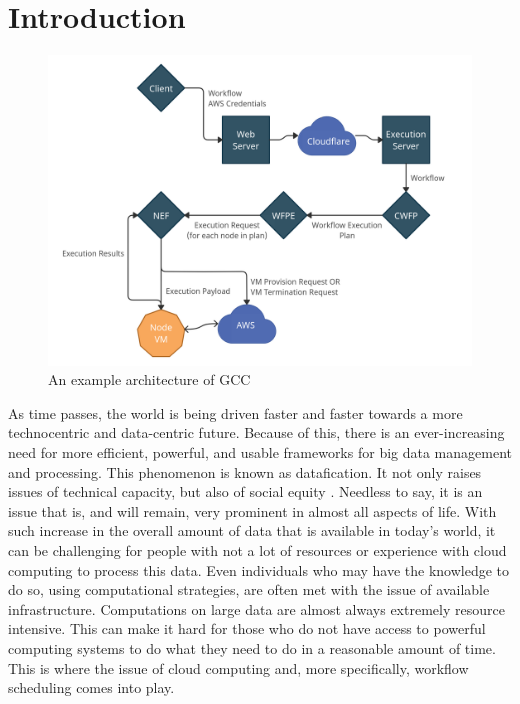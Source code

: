 \documentclass[fleqn,10pt]{SelfArx} %
\affiliation{\textsuperscript{1}\textit{Department of Computer Science, Allegheny College, Meadville, PA}}
\affiliation{*\textbf{Corresponding author}: lorian@allegheny.edu}
\begin{document}
\maketitle %

\tableofcontents %

\thispagestyle{empty} %


\section{Introduction}
\label{sec:introduction}

\begin{figure}[t!]
\includegraphics[width=\textwidth]{Figures/gcc_total_workflow.png}
\caption{An example architecture of GCC}
\label{fig:gccworkflow}
\end{figure}

As time passes, the world is being driven faster and faster towards a more technocentric and data-centric future. Because of this, there is an ever-increasing need for more efficient, powerful, and usable frameworks for big data management and processing. This phenomenon is known as datafication. It not only raises issues of technical capacity, but also of social equity \cite{mejias2019datafication}. Needless to say, it is an issue that is, and will remain, very prominent in almost all aspects of life. With such increase in the overall amount of data that is available in today's world, it can be challenging for people with not a lot of resources or experience with cloud computing to process this data. Even individuals who may have the knowledge to do so, using computational strategies, are often met with the issue of available infrastructure. Computations on large data are almost always extremely resource intensive. This can make it hard for those who do not have access to powerful computing systems to do what they need to do in a reasonable amount of time. This is where the issue of cloud computing and, more specifically, workflow scheduling comes into play.
\end{document}
